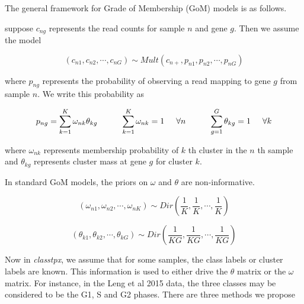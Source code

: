 \documentclass[12pt]{article}
\newcommand{\classtpx}{\textit{classtpx}}
\begin{document}
The general framework for Grade of Membership (GoM) models is as follows.

suppose $c_{ng}$ represents the read counts for sample $n$ and gene $g$. Then we assume the model

\begin{equation}
\left (c_{n1}, c_{n2}, \cdots, c_{nG} \right) \sim Mult \left (c_{n+}, p_{n1}, p_{n2}, \cdots, p_{nG} \right)
\end{equation}

where $p_{ng}$ represents the probability of observing a read mapping to gene $g$ from sample $n$. We write this probability as 

\begin{equation}
p_{ng} = \sum_{k=1}^{K} \omega_{nk} \theta_{kg} \hspace{1 cm} \sum_{k=1}^{K} \omega_{nk}=1 \hspace{0.5 cm} \forall n \hspace{1 cm} \sum_{g=1}^{G} \theta_{kg}=1 \hspace{0.5 cm} \forall k 
\end{equation}

where $\omega_{nk}$ represents membership probability of $k$ th cluster in the $n$ th sample and $\theta_{kg}$ represents cluster mass at gene $g$ for cluster $k$.

In standard GoM models, the priors on $\omega$ and $\theta$ are non-informative.

\begin{equation}
\left(\omega_{n1}, \omega_{n2}, \cdots, \omega_{nK} \right) \sim Dir \left ( \frac{1}{K}, \frac{1}{K}, \cdots, \frac{1}{K} \right)
\end{equation}

\begin{equation}
\left(\theta_{k1}, \theta_{k2}, \cdots, \theta_{kG} \right) \sim Dir \left ( \frac{1}{KG}, \frac{1}{KG}, \cdots, \frac{1}{KG} \right)
\end{equation}

Now in \classtpx{}, we assume that for some samples, the class labels or cluster labels are known. 
This information is used to either drive the $\theta$ matrix or the $\omega$ matrix. For instance, in the Leng et al 2015 data, the three classes may be considered to be the G1, S and G2 phases. There are three methods we propose 
\end{document}

